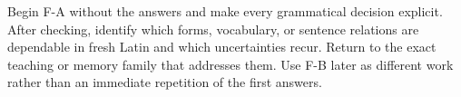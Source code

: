   Begin F-A without the answers and make every grammatical decision explicit.
  After checking, identify which forms, vocabulary, or sentence relations are
  dependable in fresh Latin and which uncertainties recur. Return to the exact
  teaching or memory family that addresses them. Use F-B later as different
  work rather than an immediate repetition of the first answers.

